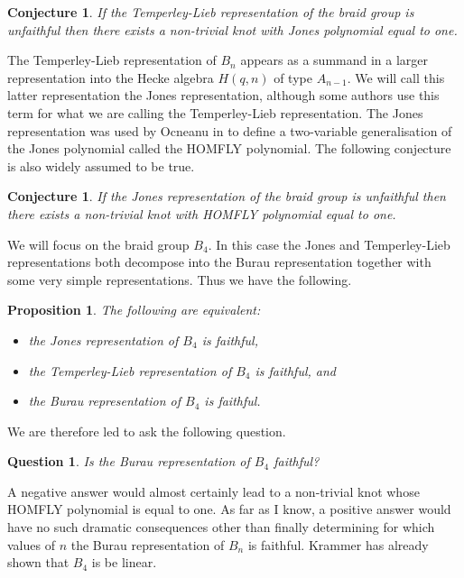 \documentclass[10pt]{amsart}
\theoremstyle{plain}
\newtheorem{prop}[thm]{Proposition}
\newtheorem{conj}[thm]{Conjecture}
\newtheorem{qn}[thm]{Question}
\theoremstyle{definition}
\begin{document}
\begin{conj}
\label{tl_poly}
If the Temperley-Lieb representation of the braid group is unfaithful
then there exists a non-trivial knot with Jones polynomial equal to one.
\end{conj}

The Temperley-Lieb representation of $B_n$
appears as a summand in a larger representation
into the Hecke algebra $H(q,n)$ of type $A_{n-1}$.
We will call this latter representation the Jones representation,
although some authors use this term
for what we are calling the Temperley-Lieb representation.
The Jones representation
was used by Ocneanu in \cite{homfly}
to define a two-variable generalisation of the Jones polynomial
called the HOMFLY polynomial.
The following conjecture is also widely assumed to be true.

\begin{conj}
\label{hecke_poly}
If the Jones representation of the braid group is unfaithful
then there exists a non-trivial knot with HOMFLY polynomial equal to one.
\end{conj}

We will focus on the braid group $B_4$.
In this case
the Jones and Temperley-Lieb representations
both decompose into the Burau representation
together with some very simple representations.
Thus we have the following.

\begin{prop}
\label{equifaithful}
The following are equivalent:
\begin{itemize}
\item the Jones representation of $B_4$ is faithful,
\item the Temperley-Lieb representation of $B_4$ is faithful, and
\item the Burau representation of $B_4$ is faithful.
\end{itemize}
\end{prop}

We are therefore led to ask the following question.

\begin{qn}
Is the Burau representation of $B_4$ faithful?
\end{qn}

A negative answer would almost certainly lead to 
a non-trivial knot whose HOMFLY polynomial is equal to one.
As far as I know, 
a positive answer would have no such dramatic consequences
other than finally determining
for which values of $n$ the Burau representation of $B_n$ is faithful.
Krammer \cite{krammer} has already shown that $B_4$ is be linear.
\end{document}

